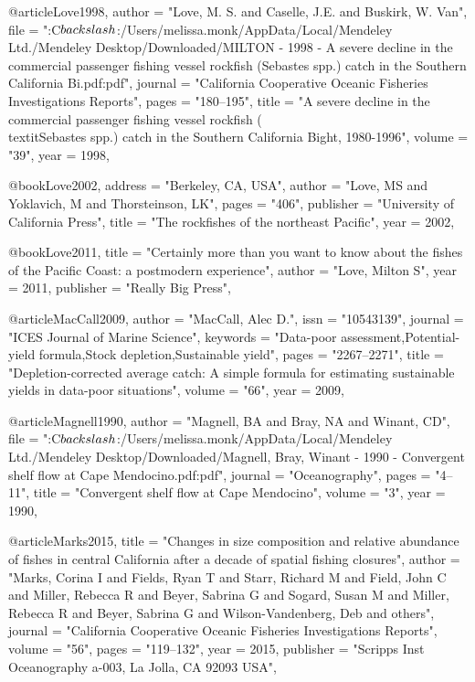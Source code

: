@article{Love1998,
    author = "{Love, M. S. and Caselle, J.E. and Buskirk, W. Van}",
    file = "{:C$\\backslash$:/Users/melissa.monk/AppData/Local/Mendeley Ltd./Mendeley Desktop/Downloaded/MILTON - 1998 - A severe decline in the commercial passenger fishing vessel rockfish (Sebastes spp.) catch in the Southern California Bi.pdf:pdf}",
    journal = "{California Cooperative Oceanic Fisheries Investigations Reports}",
    pages = "{180--195}",
    title = "{{A severe decline in the commercial passenger fishing vessel rockfish (\\textit{{Sebastes}} spp.) catch in the Southern California Bight, 1980-1996}}",
    volume = "{39}",
    year = 1998,
}

@book{Love2002,
    address = "{Berkeley, CA, USA}",
    author = "{Love, MS and Yoklavich, M and Thorsteinson, LK}",
    pages = "{406}",
    publisher = "{University of California Press}",
    title = "{{The rockfishes of the northeast Pacific}}",
    year = 2002,
}

@book{Love2011,
    title = "{Certainly more than you want to know about the fishes of the Pacific Coast: a postmodern experience}",
    author = "{Love, Milton S}",
    year = 2011,
    publisher = "{Really Big Press}",
}

@article{MacCall2009,
    author = "{MacCall, Alec D.}",
    issn = "{10543139}",
    journal = "{ICES Journal of Marine Science}",
    keywords = "{Data-poor assessment,Potential-yield formula,Stock depletion,Sustainable yield}",
    pages = "{2267--2271}",
    title = "{{Depletion-corrected average catch: A simple formula for estimating sustainable yields in data-poor situations}}",
    volume = "{66}",
    year = 2009,
}

@article{Magnell1990,
    author = "{Magnell, BA and Bray, NA and Winant, CD}",
    file = "{:C$\\backslash$:/Users/melissa.monk/AppData/Local/Mendeley Ltd./Mendeley Desktop/Downloaded/Magnell, Bray, Winant - 1990 - Convergent shelf flow at Cape Mendocino.pdf:pdf}",
    journal = "{Oceanography}",
    pages = "{4--11}",
    title = "{{Convergent shelf flow at Cape Mendocino}}",
    volume = "{3}",
    year = 1990,
}

@article{Marks2015,
    title = "{Changes in size composition and relative abundance of fishes in central California after a decade of spatial fishing closures}",
    author = "{Marks, Corina I and Fields, Ryan T and Starr, Richard M and Field, John C and Miller, Rebecca R and Beyer, Sabrina G and Sogard, Susan M and Miller, Rebecca R and Beyer, Sabrina G and Wilson-Vandenberg, Deb and others}",
    journal = "{California Cooperative Oceanic Fisheries Investigations Reports}",
    volume = "{56}",
    pages = "{119--132}",
    year = 2015,
    publisher = "{Scripps Inst Oceanography a-003, La Jolla, CA 92093 USA}",
}

